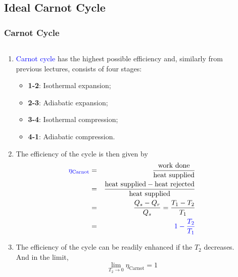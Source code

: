 \documentclass[10pt,compress]{beamer}
\newcommand{\frc}{\displaystyle\frac}
\newcommand{\blue}{\textcolor{blue}}
\begin{document}
\subsection{Ideal Carnot Cycle}
\begin{frame}
 \frametitle{Carnot Cycle}
 \begin{columns}
  \begin{column}[c]{0.45\linewidth}
   \begin{enumerate}[(1)] \scriptsize
     \item<1-> \blue{Carnot cycle} has the highest possible efficiency and, similarly from previous lectures, consists of four stages:
     \begin{itemize}\scriptsize
       \item<1-> {\bf 1-2}: Isothermal expansion; 
       \item<1-> {\bf 2-3}: Adiabatic expansion;
       \item<1-> {\bf 3-4}: Isothermal compression;
       \item<1-> {\bf 4-1}: Adiabatic compression.
     \end{itemize}\scriptsize
     \item <3-> The efficiency of the cycle is then given by
       \begin{eqnarray}
        \textcolor{blue}{\eta_{\text{Carnot}}} &=& \displaystyle\frac{\text{work done}}{\text{heat supplied}} \nonumber\\
                         &=& \displaystyle\frac{\text{heat supplied}-\text{heat rejected}}{\text{heat supplied}} \nonumber \\
                         &=& \displaystyle\frac{Q_{s}-Q_{r}}{Q_{s}} = \displaystyle\frac{T_{1}-T_{2}}{T_{1}} \nonumber  \\
                         &=&  \blue{1 - \frc{T_{2}}{T_{1}}}
       \end{eqnarray}
     \item<4-> The efficiency of the cycle can be readily enhanced if the $T_{2}$ decreases. And in the limit,
        \begin{displaymath}
           \lim_{T_{2} \to 0}\eta_{\text{Carnot}} = 1
        \end{displaymath}
   \end{enumerate}
  \end{column}
  \begin{column}[c]{0.55\linewidth}
   \begin{enumerate}[(1)]\setcounter{enumi}{3} \scriptsize

\end{enumerate}
\end{column}
\end{columns}
\end{frame}
\end{document}
